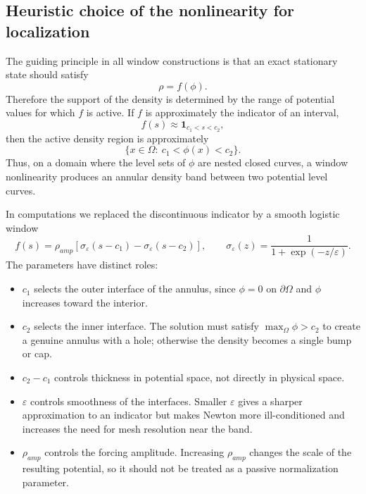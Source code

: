 \documentclass[11pt,a4paper]{article}
\newcommand{\Om}{\Omega}
\newcommand{\eps}{\varepsilon}
\begin{document}
\subsection{Heuristic choice of the nonlinearity for localization}

The guiding principle in all window constructions is that an exact stationary
state should satisfy
\begin{equation}
  \rho=f(\phi).
\end{equation}
Therefore the support of the density is determined by the range of potential
values for which $f$ is active. If $f$ is approximately the indicator of an
interval,
\begin{equation}
  f(s)\approx \mathbf{1}_{c_1<s<c_2},
\end{equation}
then the active density region is approximately
\begin{equation}
  \{x\in\Om:\ c_1<\phi(x)<c_2\}.
\end{equation}
Thus, on a domain where the level sets of $\phi$ are nested closed curves, a
window nonlinearity produces an annular density band between two potential
level curves.

In computations we replaced the discontinuous indicator by a smooth logistic
window
\begin{equation}
  f(s)=\rho_{amp}\left[
  \sigma_\eps(s-c_1)-\sigma_\eps(s-c_2)
  \right],
  \qquad
  \sigma_\eps(z)=\frac{1}{1+\exp(-z/\eps)}.
\end{equation}
The parameters have distinct roles:
\begin{itemize}[leftmargin=2em]
  \item $c_1$ selects the outer interface of the annulus, since $\phi=0$ on
  $\partial\Om$ and $\phi$ increases toward the interior.
  \item $c_2$ selects the inner interface. The solution must satisfy
  $\max_\Om \phi>c_2$ to create a genuine annulus with a hole; otherwise the
  density becomes a single bump or cap.
  \item $c_2-c_1$ controls thickness in potential space, not directly in
  physical space.
  \item $\eps$ controls smoothness of the interfaces. Smaller $\eps$ gives a
  sharper approximation to an indicator but makes Newton more ill-conditioned
  and increases the need for mesh resolution near the band.
  \item $\rho_{amp}$ controls the forcing amplitude. Increasing $\rho_{amp}$
  changes the scale of the resulting potential, so it should not be treated as
  a passive normalization parameter.
\end{itemize}
\end{document}
